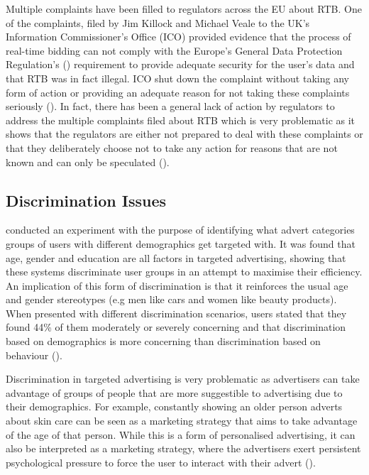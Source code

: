 \documentclass{l4proj}
\begin{document}
Multiple complaints have been filled to regulators across the EU about RTB. One of the complaints, filed by Jim Killock and Michael Veale to the UK's Information Commissioner's Office (ICO) provided evidence that the process of real-time bidding can not comply with the Europe’s General Data Protection Regulation's (\cite{gdpr}) requirement to provide adequate security for the user's data and that RTB was in fact illegal. ICO shut down the complaint without taking any form of action or providing an adequate reason for not taking these complaints seriously (\cite{rtbcomplaint}). In fact, there has been a general lack of action by regulators to address the multiple complaints filed about RTB which is very problematic as it shows that the regulators are either not prepared to deal with these complaints or that they deliberately choose not to take any action for reasons that are not known and can only be speculated (\cite{report}).

\subsection{Discrimination Issues}
\cite{Bol2019a} conducted an experiment with the purpose of identifying what advert categories groups of users with different demographics get targeted with. It was found that age, gender and education are all factors in targeted advertising, showing that these systems discriminate user groups in an attempt to maximise their efficiency. An implication of this form of discrimination is that it reinforces the usual age and gender stereotypes (e.g men like cars and women like beauty products). When presented with different discrimination scenarios, users stated that they found 44\% of them moderately or severely concerning and that discrimination based on demographics is more concerning than discrimination based on behaviour (\cite{Plane2017}).

Discrimination in targeted advertising is very problematic as advertisers can take advantage of groups of people that are more suggestible to advertising due to their demographics. For example, constantly showing an older person adverts about skin care can be seen as a marketing strategy that aims to take advantage of the age of that person. While this is a form of personalised advertising, it can also be interpreted as a marketing strategy, where the advertisers exert persistent psychological pressure to force the user to interact with their advert (\cite{fennis2015psychology}).

\end{document}
